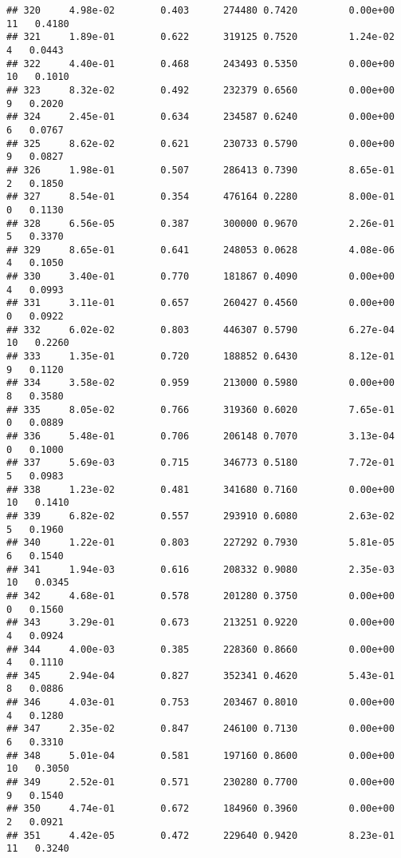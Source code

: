 \documentclass[
]{article}
\begin{document}
\begin{verbatim}
## 320     4.98e-02        0.403      274480 0.7420         0.00e+00  11   0.4180
## 321     1.89e-01        0.622      319125 0.7520         1.24e-02   4   0.0443
## 322     4.40e-01        0.468      243493 0.5350         0.00e+00  10   0.1010
## 323     8.32e-02        0.492      232379 0.6560         0.00e+00   9   0.2020
## 324     2.45e-01        0.634      234587 0.6240         0.00e+00   6   0.0767
## 325     8.62e-02        0.621      230733 0.5790         0.00e+00   9   0.0827
## 326     1.98e-01        0.507      286413 0.7390         8.65e-01   2   0.1850
## 327     8.54e-01        0.354      476164 0.2280         8.00e-01   0   0.1130
## 328     6.56e-05        0.387      300000 0.9670         2.26e-01   5   0.3370
## 329     8.65e-01        0.641      248053 0.0628         4.08e-06   4   0.1050
## 330     3.40e-01        0.770      181867 0.4090         0.00e+00   4   0.0993
## 331     3.11e-01        0.657      260427 0.4560         0.00e+00   0   0.0922
## 332     6.02e-02        0.803      446307 0.5790         6.27e-04  10   0.2260
## 333     1.35e-01        0.720      188852 0.6430         8.12e-01   9   0.1120
## 334     3.58e-02        0.959      213000 0.5980         0.00e+00   8   0.3580
## 335     8.05e-02        0.766      319360 0.6020         7.65e-01   0   0.0889
## 336     5.48e-01        0.706      206148 0.7070         3.13e-04   0   0.1000
## 337     5.69e-03        0.715      346773 0.5180         7.72e-01   5   0.0983
## 338     1.23e-02        0.481      341680 0.7160         0.00e+00  10   0.1410
## 339     6.82e-02        0.557      293910 0.6080         2.63e-02   5   0.1960
## 340     1.22e-01        0.803      227292 0.7930         5.81e-05   6   0.1540
## 341     1.94e-03        0.616      208332 0.9080         2.35e-03  10   0.0345
## 342     4.68e-01        0.578      201280 0.3750         0.00e+00   0   0.1560
## 343     3.29e-01        0.673      213251 0.9220         0.00e+00   4   0.0924
## 344     4.00e-03        0.385      228360 0.8660         0.00e+00   4   0.1110
## 345     2.94e-04        0.827      352341 0.4620         5.43e-01   8   0.0886
## 346     4.03e-01        0.753      203467 0.8010         0.00e+00   4   0.1280
## 347     2.35e-02        0.847      246100 0.7130         0.00e+00   6   0.3310
## 348     5.01e-04        0.581      197160 0.8600         0.00e+00  10   0.3050
## 349     2.52e-01        0.571      230280 0.7700         0.00e+00   9   0.1540
## 350     4.74e-01        0.672      184960 0.3960         0.00e+00   2   0.0921
## 351     4.42e-05        0.472      229640 0.9420         8.23e-01  11   0.3240

\end{verbatim}
\end{document}
